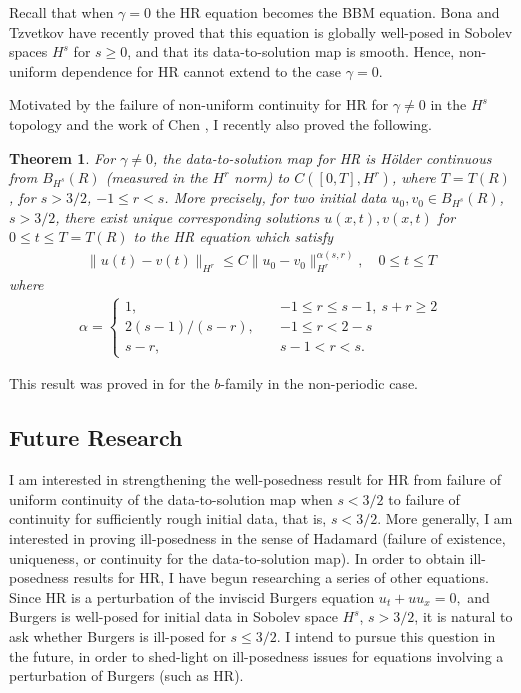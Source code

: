 \documentclass[12pt,reqno]{amsart}
\newtheorem{theorem}{Theorem}
\begin{document}
Recall that when  $\gamma=0$ the HR equation becomes the BBM
equation. Bona and Tzvetkov \cite{Bona_2009_Sharp-well-pose} have recently
proved  that this equation  is globally well-posed in  Sobolev spaces $H^s$ for
$s \ge 0$, and that its data-to-solution map is smooth. Hence, non-uniform
dependence for HR cannot extend to the case $\gamma = 0$. 

Motivated by the failure of non-uniform continuity for HR for $\gamma \neq 0$ in
the $H^{s}$ topology and the work of Chen \cite{Chen:2011fk}, I recently also proved the following.
%
%
\begin{theorem}
For $\gamma \neq 0$, the
data-to-solution map for HR is H\"older continuous from $B_{H^{s}}(R)$ (measured in the $H^{r}$ norm)
to $C([0, T], H^{r})$, where $T = T(R)$, for $s >
3/2$, $-1 \le r < s$. 
%
More precisely, for two initial data $u_{0}, v_{0} \in B_{H^{s}}(R)$, $s > 3/2$, there exist unique
corresponding solutions $u(x,t), v(x,t)$ for $0 \le t \le T= T(R)$ to the
HR equation which satisfy 
%
%
\begin{equation*}
\begin{split}
  \| u(t) - v(t) \|_{H^{r}} \le C \| u_{0} - v_{0} \|_{H^{r}}^{\alpha(s, r)},
  \quad 0
  \le t \le T
\end{split}
\end{equation*}
%
%
where  
%
%
\begin{equation*}
\begin{split}
\alpha = 
\begin{cases}
    1,  \quad  & -1 \le r \le s-1, \ s + r \ge 2  
  \\
  2(s-1)/(s-r), \quad  &  -1 \le r < 2-s 
  \\
  s-r, \quad  & s-1 < r < s. 
\end{cases}
\end{split}
\end{equation*}
\label{thm:main-thm}
\end{theorem}
This result was proved in \cite{Chen:2011fk} for the $b$-family in the
non-periodic case.
%
%
\subsection{Future Research} 
\label{ssec:fut-res}
 I am interested in strengthening the well-posedness
result for HR from failure of uniform continuity of the data-to-solution map
when $s<3/2$ to failure of continuity for sufficiently rough initial data, that
is, $s<3/2$. More generally, I am interested in proving ill-posedness in the
sense of Hadamard (failure of existence, uniqueness, or
continuity for the data-to-solution map). In order to obtain ill-posedness
results for HR, I have begun researching a series of other equations. Since HR is a perturbation of the
inviscid Burgers equation
$
    u_{t} + u u_{x} = 0,
$
and Burgers is well-posed for initial data in Sobolev space $H^{s}$, $s > 3/2$,
it is natural to ask whether Burgers is ill-posed for $s \le 3/2$. I intend to
pursue this question in the future, in order to shed-light on ill-posedness
issues for equations involving a perturbation of Burgers (such as HR).
\end{document}
